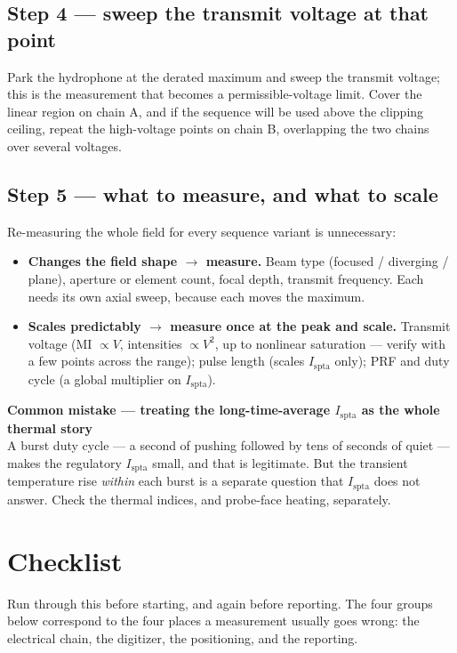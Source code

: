 \documentclass[11pt,a4paper]{article}
\newcommand{\mistaketitle}[1]{\textcolor{orange!75!black}{\textbf{Common mistake --- #1}}\\[2pt]}
\begin{document}
\subsection{Step 4 --- sweep the transmit voltage at that point}
Park the hydrophone at the derated maximum and sweep the transmit voltage; this is the measurement
that becomes a permissible-voltage limit. Cover the linear region on chain A, and if the sequence
will be used above the clipping ceiling, repeat the high-voltage points on chain B, overlapping the
two chains over several voltages.

\subsection{Step 5 --- what to measure, and what to scale}\label{sec:scaling}
Re-measuring the whole field for every sequence variant is unnecessary:
\begin{itemize}
  \item \textbf{Changes the field shape $\rightarrow$ measure.} Beam type (focused / diverging /
    plane), aperture or element count, focal depth, transmit frequency. Each needs its own axial
    sweep, because each moves the maximum.
  \item \textbf{Scales predictably $\rightarrow$ measure once at the peak and scale.} Transmit
    voltage (MI $\propto V$, intensities $\propto V^2$, up to nonlinear saturation --- verify with a
    few points across the range); pulse length (scales $I_\mathrm{spta}$ only); PRF and duty cycle (a
    global multiplier on $I_\mathrm{spta}$).
\end{itemize}

\begin{mistake}
\mistaketitle{treating the long-time-average $I_\mathrm{spta}$ as the whole thermal story}
A burst duty cycle --- a second of pushing followed by tens of seconds of quiet --- makes the
regulatory $I_\mathrm{spta}$ small, and that is legitimate. But the transient temperature rise
\emph{within} each burst is a separate question that $I_\mathrm{spta}$ does not answer. Check the
thermal indices, and probe-face heating, separately.
\end{mistake}

\section{Checklist}\label{sec:checklist}
Run through this before starting, and again before reporting. The four groups below correspond to
the four places a measurement usually goes wrong: the electrical chain, the digitizer, the
positioning, and the reporting.
\end{document}
